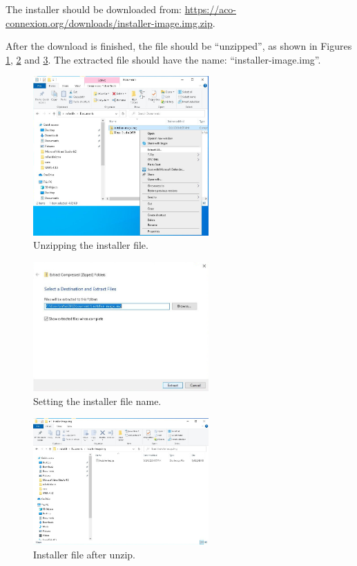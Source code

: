 \documentclass[11pt,a4paper]{article}
\begin{document}
The installer should be downloaded from: \url{https://aco-connexion.org/downloads/installer-image.img.zip}.

After the download is finished, the file should be ``unzipped'', as shown in Figures \ref{fig:extract1}, \ref{fig:extract2}
and \ref{fig:extract3}.
The extracted file should have the name: ``installer-image.img''.

\begin{figure}[H]
  \centering
  \includegraphics[width=0.6\textwidth]{pictures/extract-1-ed.jpg}
  \caption{Unzipping the installer file.}
  \label{fig:extract1}
\end{figure}

\begin{figure}[H]
  \centering
  \includegraphics[width=0.6\textwidth]{pictures/extract-2-ed.jpg}
  \caption{Setting the installer file name.}
  \label{fig:extract2}
\end{figure}

\begin{figure}[H]
  \centering
  \includegraphics[width=0.6\textwidth]{pictures/extract-3-ed.jpg}
  \caption{Installer file after unzip.}
  \label{fig:extract3}
\end{figure}
\end{document}
